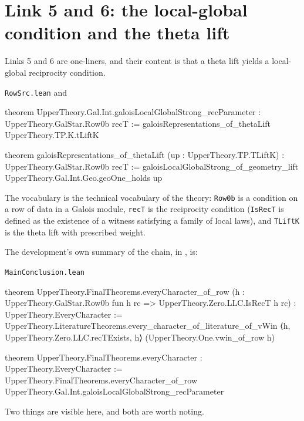 \section{Link 5 and 6: the local-global condition and the theta lift}Links 5 and 6 are one-liners, and their content is that a theta lift yields a
local-global reciprocity condition.

\begin{seamnote}{\texttt{RowSrc.lean} and }
\begin{leanquote}
theorem UpperTheory.Gal.Int.galoisLocalGlobalStrong_recParameter :
    UpperTheory.GalStar.Row0b recT :=
  galoisRepresentations_of_thetaLift UpperTheory.TP.K.tLiftK
\end{leanquote}
\begin{leanquote}
theorem galoisRepresentations_of_thetaLift (up : UpperTheory.TP.TLiftK) :
    UpperTheory.GalStar.Row0b recT :=
  galoisLocalGlobalStrong_of_geometry_lift
    UpperTheory.Gal.Int.Geo.geoOne_holds up
\end{leanquote}
\end{seamnote}

The vocabulary is the technical vocabulary of the theory: \texttt{Row0b} is a
condition on a row of data in a Galois module, \texttt{recT} is the
reciprocity condition (\texttt{IsRecT} is defined as the existence of a
witness satisfying a family of local laws), and \texttt{TLiftK} is the theta
lift with prescribed weight.

The development's own summary of the chain, in
, is:

\begin{seamnote}{\texttt{MainConclusion.lean}}
\begin{leanquote}
theorem UpperTheory.FinalTheorems.everyCharacter_of_row
    (h : UpperTheory.GalStar.Row0b fun h rc => UpperTheory.Zero.LLC.IsRecT h rc) :
    UpperTheory.EveryCharacter :=
  UpperTheory.LiteratureTheorems.every_character_of_literature_of_vWin
    ⟨h, UpperTheory.Zero.LLC.recTExists, h⟩ (UpperTheory.One.vwin_of_row h)

theorem UpperTheory.FinalTheorems.everyCharacter : UpperTheory.EveryCharacter :=
  UpperTheory.FinalTheorems.everyCharacter_of_row
    UpperTheory.Gal.Int.galoisLocalGlobalStrong_recParameter
\end{leanquote}
\end{seamnote}

Two things are visible here, and both are worth noting.

